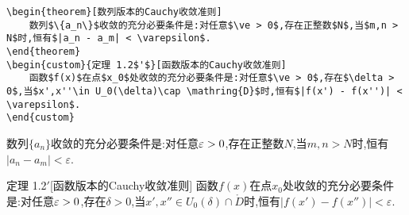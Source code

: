 \documentclass[lang=cn,12pt,scheme=chinese,mode=simple,black]{elegantbook}
\begin{document}
\begin{lstlisting}
\begin{theorem}[数列版本的Cauchy收敛准则]
    数列$\{a_n\}$收敛的充分必要条件是:对任意$\ve > 0$,存在正整数$N$,当$m,n > N$时,恒有$|a_n - a_m| < \varepsilon$.
\end{theorem}
\begin{custom}{定理 1.2$'$}[函数版本的Cauchy收敛准则]
    函数$f(x)$在点$x_0$处收敛的充分必要条件是:对任意$\ve > 0$,存在$\delta > 0$,当$x',x''\in U_0(\delta)\cap \mathring{D}$时,恒有$|f(x') - f(x'')| < \varepsilon$.
\end{custom}
\end{lstlisting}

\begin{resultbox}
    \begin{theorem}[数列版本的Cauchy收敛准则]
        数列$\{a_n\}$收敛的充分必要条件是:对任意$\varepsilon > 0$,存在正整数$N$,当$m,n > N$时,恒有$|a_n - a_m| < \varepsilon$.
    \end{theorem}
    \begin{custom}{定理 1.2$'$}[函数版本的Cauchy收敛准则]
        函数$f(x)$在点$x_0$处收敛的充分必要条件是:对任意$\varepsilon > 0$,存在$\delta > 0$,当$x',x''\in U_0(\delta)\cap \mathring{D}$时,恒有$|f(x') - f(x'')| < \varepsilon$.
    \end{custom}
\end{resultbox}
\end{document}
